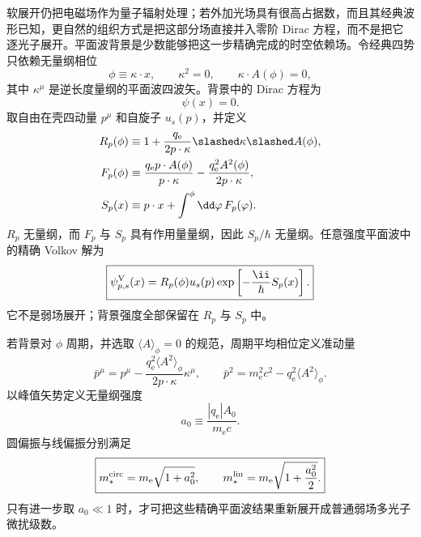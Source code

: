 软展开仍把电磁场作为量子辐射处理；若外加光场具有很高占据数，而且其经典波形已知，更自然的组织方式是把这部分场直接并入零阶 Dirac 方程，而不是把它逐光子展开。平面波背景是少数能够把这一步精确完成的时空依赖场。令经典四势只依赖无量纲相位
\begin{equation*}
 \phi\equiv\kappa\cdot x,
 \qquad
 \kappa^2=0,
 \qquad
 \kappa\cdot A(\phi)=0,
\end{equation*}
其中 $\kappa^\mu$ 是逆长度量纲的平面波四波矢。背景中的 Dirac 方程为
\begin{equation}
 [\ii\hbar\slashed\partial-q_{\mathrm e}\slashed A(\phi)-m_{\mathrm e} c]\psi(x)=0.
 \label{eq:Volkov-Dirac-r12}
\end{equation}
取自由在壳四动量 $p^\mu$ 和自旋子 $u_s(p)$，并定义
\begin{align*}
 R_p(\phi)
 &\equiv
 1+\frac{q_{\mathrm e}}{2p\cdot\kappa}
 \slashed\kappa\slashed A(\phi),\\
 F_p(\phi)
 &\equiv
 \frac{q_{\mathrm e} p\cdot A(\phi)}{p\cdot\kappa}
 -\frac{q_{\mathrm e}^2A^2(\phi)}{2p\cdot\kappa},\\
 S_p(x)
 &\equiv p\cdot x+\int^{\phi}\dd\varphi\,F_p(\varphi).
\end{align*}
$R_p$ 无量纲，而 $F_p$ 与 $S_p$ 具有作用量量纲，因此 $S_p/\hbar$ 无量纲。任意强度平面波中的精确 Volkov 解为
\begin{equation}
 \boxed{
 \psi_{p,s}^{\rm V}(x)
 =R_p(\phi)u_s(p)
 \exp\left[-\frac{\ii}{\hbar}S_p(x)\right].}
 \label{eq:Volkov-solution-r12}
\end{equation}
它不是弱场展开；背景强度全部保留在 $R_p$ 与 $S_p$ 中。

若背景对 $\phi$ 周期，并选取 $\langle A\rangle_\phi=0$ 的规范，周期平均相位定义准动量
\begin{equation}
 \boxed{
 \bar p^\mu
 =p^\mu
 -\frac{q_{\mathrm e}^2\langle A^2\rangle_\phi}{2p\cdot\kappa}\kappa^\mu,
 \qquad
 \bar p^2=m_{\mathrm e}^2c^2-q_{\mathrm e}^2\langle A^2\rangle_\phi.}
 \label{eq:volkov-quasimomentum-dp43}
\end{equation}
以峰值矢势定义无量纲强度
\begin{equation*}
 a_0\equiv\frac{|q_{\mathrm e}|A_0}{m_{\mathrm e} c}.
\end{equation*}
圆偏振与线偏振分别满足
\begin{equation}
 \boxed{
 m_*^{\rm circ}=m_{\mathrm e}\sqrt{1+a_0^2},
 \qquad
 m_*^{\rm lin}=m_{\mathrm e}\sqrt{1+\frac{a_0^2}{2}}.}
 \label{eq:volkov-effective-mass-dp43}
\end{equation}
只有进一步取 $a_0\ll1$ 时，才可把这些精确平面波结果重新展开成普通弱场多光子微扰级数。

